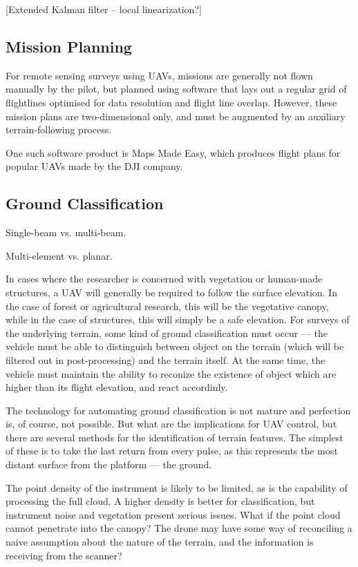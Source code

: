 \documentclass[10pt,a4paper]{report}
\begin{document}
[Extended Kalman filter -- local linearization?]

\fi

\subsection{Mission Planning}


For remote sensing surveys using UAVs, missions are generally not flown manually by the pilot, but planned using software that lays out a regular grid of flightlines optimised for data resolution and flight line overlap. However, these mission plans are two-dimensional only, and must be augmented by an auxiliary terrain-following process.

One such software product is Maps Made Easy, which produces flight plans for popular UAVs made by the DJI company. 


\subsection{Ground Classification}

Single-beam vs. multi-beam.

Multi-element vs. planar. \cite{Nobili2015}


In cases where the researcher is concerned with vegetation or human-made structures, a UAV will generally be required to follow the surface elevation. In the case of forest or agricultural research, this will be the vegetative canopy, while in the case of structures, this will simply be a safe elevation. For surveys of the underlying terrain, some kind of ground classification must occur --- the vehicle must be able to distinguish between object on the terrain (which will be filtered out in post-processing) and the terrain itself. At the same time, the vehicle must maintain the ability to reconize the existence of object which are higher than its flight elevation, and react accordinly.

The technology for automating ground classification is not mature \cite{Vosselman2001,Vosselman2000} and perfection is, of course, not possible. But what are the implications for UAV control, but there are several methods for the identification of terrain features. The simplest of these is to take the last return from every pulse, as this represents the most distant surface from the platform --- the ground.

The point density of the instrument is likely to be limited, as is the capability of processing the full cloud. A higher density is better for classification, but instrument noise and vegetation present serious issues. What if the point cloud cannot penetrate into the canopy? The drone may have some way of reconciling a naive assumption about the nature of the terrain, and the information is receiving from the scanner?
\end{document}
